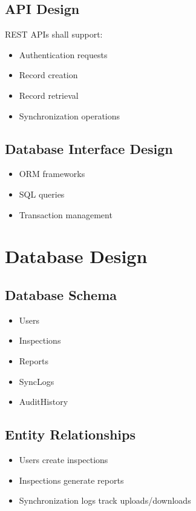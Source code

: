 \documentclass[12pt]{article}
\begin{document}
\subsection{API Design}

REST APIs shall support:

\begin{itemize}
\item Authentication requests
\item Record creation
\item Record retrieval
\item Synchronization operations
\end{itemize}

\subsection{Database Interface Design}

\begin{itemize}
\item ORM frameworks
\item SQL queries
\item Transaction management
\end{itemize}

\section{Database Design}

\subsection{Database Schema}

\begin{itemize}
\item Users
\item Inspections
\item Reports
\item SyncLogs
\item AuditHistory
\end{itemize}

\subsection{Entity Relationships}

\begin{itemize}
\item Users create inspections
\item Inspections generate reports
\item Synchronization logs track uploads/downloads
\end{itemize}
\end{document}
